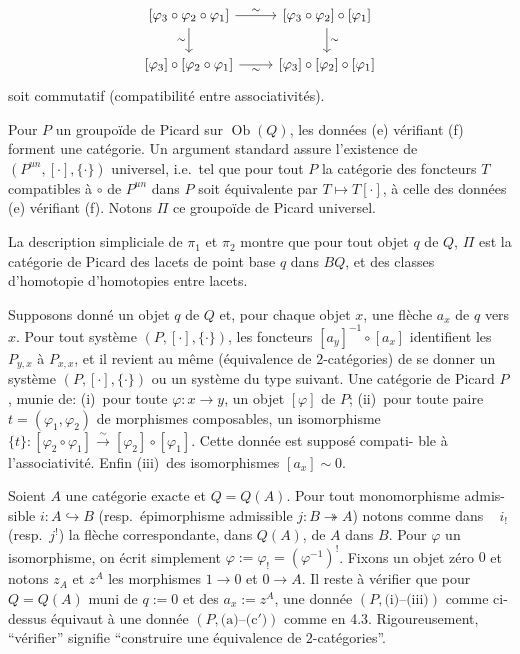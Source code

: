 \documentclass[12pt,a4paper]{article}
\theoremstyle{plain}
\theoremstyle{definition}
\DeclareMathOperator{\Ob}{Ob}
\begin{document}
\[
\begin{tikzcd}
{[\varphi_3 \circ \varphi_2 \circ \varphi_1]} \arrow[r, "\sim"] \arrow[d, "\sim"'] & {[\varphi_3 \circ \varphi_2] \circ [\varphi_1]} \arrow[d, "\sim"] \\
{[\varphi_3] \circ [\varphi_2 \circ \varphi_1]} \arrow[r, "\sim"'] & {[\varphi_3] \circ [\varphi_2] \circ [\varphi_1]}
\end{tikzcd}
\]
soit commutatif (compatibilit\'e entre associativit\'es).

Pour $P$ un groupo\"ide de Picard sur $\Ob(Q)$, les donn\'ees (e) v\'erifiant (f)
forment une cat\'egorie. Un argument standard assure l'existence de $(P^{un}, [\cdot], \{\cdot\})$
universel, i.e.\ tel que pour tout $P$ la cat\'egorie des foncteurs $T$ compatibles
\`a $\circ$ de $P^{un}$ dans $P$ soit \'equivalente par $T \mapsto T[\cdot]$, \`a celle des donn\'ees
(e) v\'erifiant (f). Notons $\Pi$ ce groupo\"ide de Picard universel.

La description simpliciale de $\pi_1$ et $\pi_2$ montre que pour tout objet $q$
de $Q$, $\Pi$ est la cat\'egorie de Picard des lacets de point base $q$ dans $BQ$,
et des classes d'homotopie d'homotopies entre lacets.

Supposons donn\'e un objet $q$ de $Q$ et, pour chaque objet $x$, une fl\`eche
$a_x$ de $q$ vers $x$. Pour tout syst\`eme $(P, [\cdot], \{\cdot\})$, les foncteurs $[a_y]^{-1} \circ
[a_x]$ identifient les $P_{y,x}$ \`a $P_{x,x}$, et il revient au m\^eme (\'equivalence
de $2$-cat\'egories) de se donner un syst\`eme $(P, [\cdot], \{\cdot\})$ ou un syst\`eme du type
suivant. Une cat\'egorie de Picard $P$, munie de: (i)~pour toute $\varphi: x \to y$, un
objet $[\varphi]$ de $P$; (ii)~pour toute paire $t = (\varphi_1, \varphi_2)$ de morphismes composables,
un isomorphisme $\{t\}: [\varphi_2 \circ \varphi_1] \xrightarrow{\sim} [\varphi_2] \circ [\varphi_1]$. Cette donn\'ee est suppos\'e compati-
ble \`a l'associativit\'e. Enfin (iii)~des isomorphismes $[a_x] \sim 0$.

Soient $A$ une cat\'egorie exacte et $Q = Q(A)$. Pour tout monomorphisme admis-
sible $i: A \hookrightarrow B$ (resp.\ \'epimorphisme admissible $j: B \twoheadrightarrow A$) notons comme dans
~\cite{12} $i_!$ (resp.\ $j^!$) la fl\`eche correspondante, dans $Q(A)$, de $A$ dans $B$.
Pour $\varphi$ un isomorphisme, on \'ecrit simplement $\varphi := \varphi_! = (\varphi^{-1})^!$. Fixons un objet
z\'ero $0$ et notons $z_A$ et $z^A$ les morphismes $1 \to 0$ et $0 \to A$. Il reste \`a
v\'erifier que pour $Q = Q(A)$ muni de $q := 0$ et des $a_x := z^A$, une donn\'ee $(P,\text{(i)--(iii)})$
comme ci-dessus \'equivaut \`a une donn\'ee $(P,\text{(a)--(c$'$)})$ comme en 4.3.
Rigoureusement, ``v\'erifier'' signifie ``construire une \'equivalence de $2$-cat\'egories''.
\end{document}
